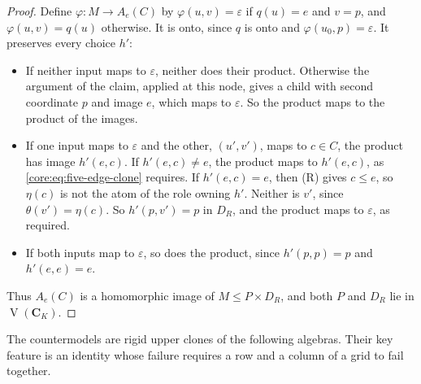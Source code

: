 \begin{proof}
Define $\varphi:M\to A_e(C)$ by $\varphi(u,v)=\varepsilon$ if $q(u)=e$ and
$v=p$, and $\varphi(u,v)=q(u)$ otherwise. It is onto, since $q$ is onto and
$\varphi(u_0,p)=\varepsilon$. It preserves every choice $h'$:
\begin{itemize}
\item If neither input maps to $\varepsilon$, neither does their product.
  Otherwise the argument of the claim, applied at this node, gives a child
  with second coordinate $p$ and image $e$, which maps to $\varepsilon$.
  So the product maps to the product of the images.
\item If one input maps to $\varepsilon$ and the other, $(u',v')$, maps to
  $c\in C$, the product has image $h'(e,c)$. If $h'(e,c)\ne e$, the product
  maps to $h'(e,c)$, as \eqref{core:eq:five-edge-clone} requires. If
  $h'(e,c)=e$, then (R) gives $c\leq e$, so $\eta(c)$ is not the atom of
  the role owning $h'$. Neither is $v'$, since $\theta(v')=\eta(c)$. So
  $h'(p,v')=p$ in $D_R$, and the product maps to $\varepsilon$, as
  required.
\item If both inputs map to $\varepsilon$, so does the product, since
  $h'(p,p)=p$ and $h'(e,e)=e$.
\end{itemize}
Thus $A_e(C)$ is a homomorphic image of $M\leq P\times D_R$, and both $P$
and $D_R$ lie in $\operatorname V(\mathbf C_K)$.
\end{proof}

The countermodels are rigid upper clones of the following algebras. Their
key feature is an identity whose failure requires a row and a column of a
grid to fail together.

